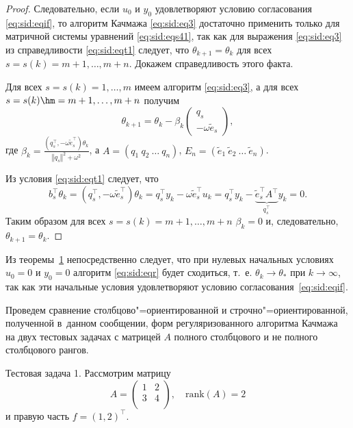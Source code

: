 \begin{proof}
Следовательно, если $u_0$ и $y_0$ удовлетворяют условию согласования \eqref{eq:sid:eqif}, то алгоритм Качмажа \eqref{eq:sid:eq3} достаточно применить только для матричной системы уравнений \eqref{eq:sid:eqs41}, так как для выражения \eqref{eq:sid:eq3} из справедливости \eqref{eq:sid:eqt1} следует, что $\theta_{k+1}=\theta_k$ для всех $s=s(k)= m+1,  \ldots, m+n$. 
Докажем справедливость этого факта.

Для всех $s=s (k)= 1,  \dots, m$ имеем алгоритм \eqref{eq:sid:eq3}, а для всех 
$s=s(k) \hm = m+1,  \dots, m+n$ получим
\begin{equation*}
\theta_{k+1} = \theta_{k}-\beta _k\left(
\begin{array}{c}
q_s\\
-\omega \tilde{e}_s
\end{array}
\right),
\end{equation*}
где $\beta_k = \frac{(q^\top _s,-\omega \tilde{e}^\top _s )\theta_k}{\left\Vert q_s\right\Vert^2+\omega^2}$, а $A = \left(q_1 \: q_2 \:\ldots \: q_n \right)$, $E_n= (\tilde{e}_1 \: \tilde{e}_2 \:  \dots \: \tilde{e}_n )$.

Из условия \eqref{eq:sid:eqt1} следует, что 
\begin{equation*}
b^\top _s \theta_k=\left(q^\top _s,-\omega \tilde{e}^\top _s\right)\theta_k
= q^\top _s  y_k-\omega \tilde{e}^\top _s u_k
= q^\top _s  y_k - \underbrace{\tilde{e}^\top _s A^\top}_{q^\top _s}y _k = 0. 
\end{equation*}
Таким образом для всех $s=s(k) = m+1,  \dots, m+n$ $\beta_k =0$ и, следовательно, $\theta_{k+1}=\theta_k$.
\hfill
\end{proof}

\smallskip

Из теоремы~\hyperlink{sid:th1}{1} непосредственно следует, что при нулевых начальных условиях $u_0=0$ и $y_0=0$ алгоритм \eqref{eq:sid:eqr} будет сходиться, т.~е. $\theta_k\to\theta_*$ при $k\to\infty$, так как эти начальные условия удовлетворяют условию согласования~\eqref{eq:sid:eqif}.

\smallskip

Проведем сравнение столбцово"=ориентированной \cite{zhdanovsid:bib:Ivanov} и строчно"=ориентированной, полученной в~данном сообщении, форм регуляризованного алгоритма Качмажа на двух тестовых задачах с матрицей $A$ полного столбцового и не полного столбцового рангов.


\hypertarget{sid:test1}{}
{\small \sc Тестовая задача 1.}
Рассмотрим матрицу 
$$
A=\left(
\begin{array}{cc}
1 & 2\\
3 & 4\\
\end{array} \right), \quad \mathrm{rank}(A)=2$$ и правую часть 
$f = (1 , 2)^\top$. 

